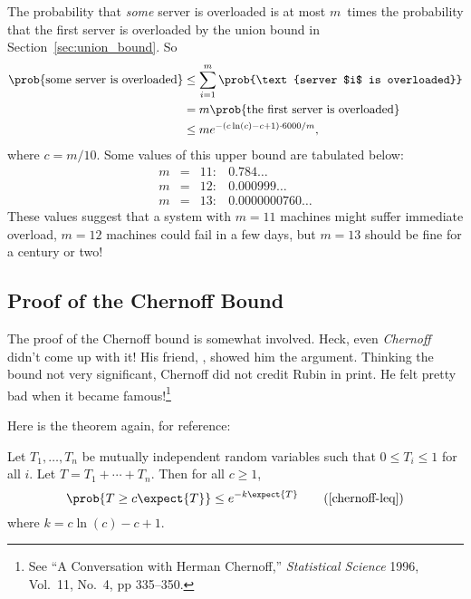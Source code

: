 The probability that \emph{some} server is overloaded is at most
$m$~times the probability that the first server is overloaded by the
union bound in Section~\ref{sec:union_bound}.  So
\begin{align*}
\prob{\text{some server is overloaded}}
    &\le \sum_{i = 1}^m \prob{\text{server $i$ is overloaded}} \\
    &= m \prob{\text{the first server is overloaded}} \\
    &\leq m e^{-(c \ln(c) - c + 1) \cdot 6000 / m},
\end{align*}
where $c = m/10$. Some values of this upper bound are tabulated below:
\[
\begin{array}{rcll}
m & = & 11: & 0.784\dots \\
m & = & 12: & 0.000999\dots \\
m & = & 13: & 0.0000000760\dots
\end{array}
\]
These values suggest that a system with $m = 11$ machines might suffer
immediate overload, $m = 12$ machines could fail in a few days, but $m
= 13$ should be fine for a century or two!

\subsection{Proof of the Chernoff Bound}\label{sec:chernoff_proof}

The proof of the Chernoff bound is somewhat involved.  Heck, even
\emph{Chernoff} didn't come up with it!  His friend, , showed him the argument.  Thinking the bound not very
significant, Chernoff did not credit Rubin in print.  He felt pretty
bad when it became famous!\footnote{See ``A Conversation with Herman
  Chernoff,'' \emph{Statistical Science} 1996, Vol.~11, No.~4, pp
  335--350.}

Here is the theorem again, for reference:

\begin{theorem}
Let $T_1, \dots, T_n$ be mutually independent random variables such
that $0 \leq T_i \leq 1$ for all $i$.  Let $T = T_1 + \cdots + T_n$.
Then for all $c \geq 1$,
\begin{equation}
\prob{T \geq c \expect{T}} \leq e^{-k \expect{T}}
\tag{\ref{chernoff-leq}}
\end{equation}
where $k = c \ln(c) - c + 1$.
\end{theorem}

